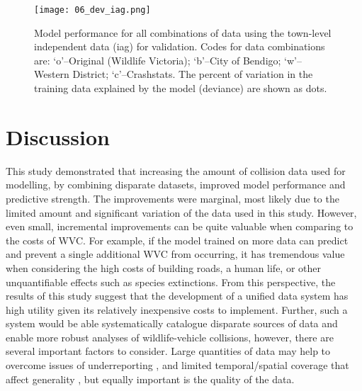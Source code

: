 \begin{figure*}[!t]
  \centering
  \texttt{[image: 06\_dev\_iag.png]}
  \caption[Model discrimination ability for all combinations of training data using the town-level independent data for validation]{Model performance for all combinations of data using the town-level independent data (iag) for validation. Codes for data combinations are: `o'--Original (Wildlife Victoria); `b'--City of Bendigo; `w'--Western District; `c'--Crashstats. The percent of variation in the training data explained by the model (deviance) are shown as dots.}
  \label{val_calib_dev}
\end{figure*}

\section{Discussion}

This study demonstrated that increasing the amount of collision data used for modelling, by combining disparate datasets, improved model performance and predictive strength. The improvements were marginal, most likely due to the limited amount and significant variation of the data used in this study. However, even small, incremental improvements can be quite valuable when comparing to the costs of WVC. For example, if the model trained on more data can predict and prevent a single additional WVC from occurring, it has tremendous value when considering the high costs of building roads, a human life, or other unquantifiable effects such as species extinctions. From this perspective, the results of this study suggest that the development of a unified data system has high utility given its relatively inexpensive costs to implement. Further, such a system would be able systematically catalogue disparate sources of data and enable more robust analyses of wildlife-vehicle collisions, however, there are several important factors to consider. Large quantities of data may help to overcome issues of underreporting \citep[see][]{snow15}, and limited temporal/spatial coverage that affect generality \citep[see][]{clev15}, but equally important is the quality of the data.

